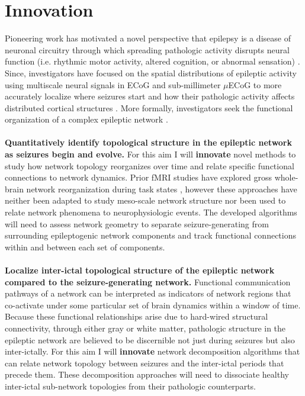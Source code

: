 \section{Innovation}
Pioneering work has motivated a novel perspective that epilepsy is a disease of neuronal circuitry through which spreading pathologic activity disrupts neural function (i.e. rhythmic motor activity, altered cognition, or abnormal sensation) \cite{kutsy1999ictal, spencer2002neural}. Since, investigators have focused on the spatial distributions of epileptic activity using multiscale neural signals in ECoG and sub-millimeter $\mu$ECoG to more accurately localize where seizures start and how their pathologic activity affects distributed cortical structures \cite{worrell2008high-frequency, schevon2009spatial, stead2010microseizures, viventi2011flexible, feldt_muldoon2013spatially, weiss2013ictal}. More formally, investigators seek the functional organization of a complex epileptic network \cite{spencer2002neural, kramer2012epilepsy, lehnertz2014evolving}.
~\\
~\\
 \textbf{Quantitatively identify topological structure in the epileptic network as seizures begin and evolve.}
For this aim I will \textbf{innovate} novel methods to study how network topology reorganizes over time and relate specific functional connections to network dynamics. Prior fMRI studies have explored gross whole-brain network reorganization during task states \cite{bassett2006adaptive, bassett2011dynamic}, however these approaches have neither been adapted to study meso-scale network structure nor been used to relate network phenomena to neurophysiologic events. The developed algorithms will need to assess network geometry to separate seizure-generating from surrounding epileptogenic network components and track functional connections \cite{holme2012temporal} within and between each set of components.
~\\
~\\
 \textbf{Localize inter-ictal topological structure of the epileptic network compared to the seizure-generating network.}
Functional communication pathways of a network can be interpreted as indicators of network regions that co-activate under some particular set of brain dynamics within a window of time. Because these functional relationships arise due to hard-wired structural connectivity, through either gray or white matter, pathologic structure in the epileptic network are believed to be discernible not just during seizures but also inter-ictally. For this aim I will \textbf{innovate} network decomposition algorithms that can relate network topology between seizures and the inter-ictal periods that precede them. These decomposition approaches will need to dissociate healthy inter-ictal sub-network topologies from their pathologic counterparts.

